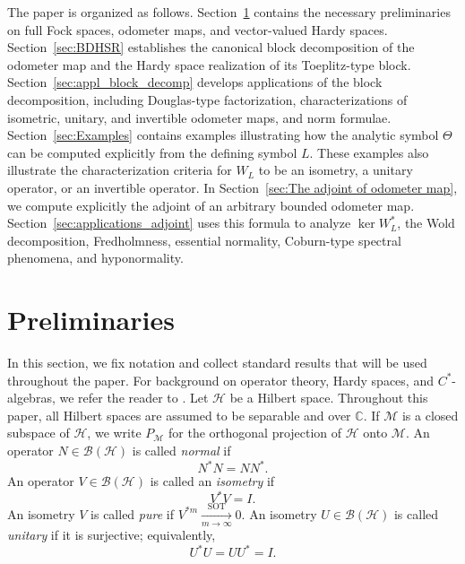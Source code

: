 \documentclass[12pt]{amsart}
\theoremstyle{definition}
\theoremstyle{remark}
\newcommand{\clb}{\mathcal{B}}
\newcommand{\clh}{\mathcal{H}}
\newcommand{\clm}{\mathcal{M}}
\numberwithin{equation}{section}
\begin{document}
The paper is organized as follows. Section~\ref{sec:Preliminaries} contains the necessary preliminaries on full Fock spaces, odometer maps,
and vector-valued Hardy spaces. Section~\ref{sec:BDHSR} establishes the canonical block decomposition of the odometer map and the Hardy space realization of its Toeplitz-type block. Section~\ref{sec:appl_block_decomp} develops applications of the block decomposition, including Douglas-type factorization, characterizations of isometric, unitary, and invertible
odometer maps, and norm formulae. Section~\ref{sec:Examples} contains examples illustrating how the analytic symbol $\Theta$ can be computed explicitly from the defining
symbol $L$. These examples also illustrate the characterization criteria for $W_L$ to be an isometry, a unitary operator, or an invertible operator. In Section~\ref{sec:The adjoint of odometer map}, we compute explicitly the adjoint of an arbitrary bounded odometer map. Section~\ref{sec:applications_adjoint} uses this formula to analyze
\(\ker W_L^*\), the Wold decomposition, Fredholmness, essential normality,
Coburn-type spectral phenomena, and hyponormality.

\section{Preliminaries} \label{sec:Preliminaries}

In this section, we fix notation and collect standard results that will be used throughout the paper. For background on operator theory, Hardy spaces, and $C^*$-algebras, we refer the reader to \cite{arveson1976,douglas1998banach,SzNagyFoias}. Let $\clh$ be a Hilbert space. Throughout this paper, all Hilbert spaces are assumed to be separable and over $\mathbb C$. If $\clm$ is a closed subspace of $\clh$, we write $P_{\clm}$ for the orthogonal projection of $\clh$ onto $\clm$. An operator $N\in\clb(\clh)$ is called \emph{normal} if
\[
N^*N=NN^*.
\]
An operator $V\in\clb(\clh)$ is called an \emph{isometry} if
\[
V^*V=I.
\]
An isometry $V$ is called \emph{pure} if $V^{*m}\xrightarrow[m\to\infty]{\mathrm{SOT}}0.$
An isometry $U\in\clb(\clh)$ is called \emph{unitary} if it is
surjective; equivalently,
\[
U^*U=UU^*=I.
\]
\end{document}
